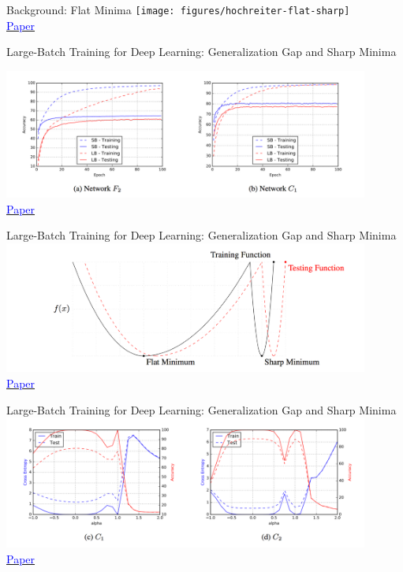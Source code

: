 \documentclass[]{beamer}
\begin{document}
\begin{frame}{Background: Flat Minima}
\centering
\texttt{[image: figures/hochreiter-flat-sharp]} \\
\href{http://www.bioinf.jku.at/publications/older/3304.pdf}{\textcolor{blue}{Paper}}
\end{frame}

\begin{frame}{Large-Batch Training for Deep Learning: Generalization Gap and Sharp Minima}

\centering
\includegraphics[width=0.9\textwidth]{figures/keskar-learning-curves-concept} \\
\href{https://openreview.net/forum?id=H1oyRlYgg}{\textcolor{blue}{Paper}}
\end{frame}

\begin{frame}{Large-Batch Training for Deep Learning: Generalization Gap and Sharp Minima}
\centering
\includegraphics[width=0.9\textwidth]{figures/keskar-flat-minima-concept} \\
\href{https://openreview.net/forum?id=H1oyRlYgg}{\textcolor{blue}{Paper}}
\end{frame}

\begin{frame}{Large-Batch Training for Deep Learning: Generalization Gap and Sharp Minima}
\centering
\includegraphics[width=0.9\textwidth]{figures/keskar-parametric-plots} \\
\href{https://openreview.net/forum?id=H1oyRlYgg}{\textcolor{blue}{Paper}}
\end{frame}
\end{document}
